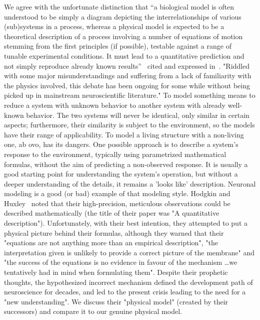 We agree with the unfortunate distinction that
“a biological model is
often understood to be simply a diagram depicting the interrelationships of various (sub)systems in a process,
whereas a physical model is expected to be a theoretical
description of a process involving a number of equations of
motion stemming from the first principles (if possible),
testable against a range of tunable experimental conditions.
It must lead to a quantitative prediction and not simply
reproduce already known results”~\cite{MolecularBiophysics:2003}
cited and expressed in~\cite{ThermodynamicAPDrukarch:2022}.
"Riddled with some major misunderstandings
and suffering from a lack of familiarity with the physics
involved, this debate has been ongoing for some while
without being picked up in mainstream neuroscientiﬁc
literature."
To model something means to reduce a system with unknown behavior
to another system with already well-known behavior. The two systems
will never be identical, only similar in certain aspects; furthermore,
their similarity is subject to the environment, so the models have
their range of applicability.
To model a living structure with a non-living one, ab ovo, has its dangers.
One possible approach is to describe a system's response
to the environment, typically using parametrized mathematical formulas,
without the aim of predicting a non-observed response. 
It is usually a good starting point for understanding the system's operation,
but without a deeper understanding of the details, it remains 
a 'looks like' description.
Neuronal modeling is a good (or bad) example of that modeling style.
Hodgkin and Huxley~\cite{HodgkinHuxley:1952} noted that their high-precision, meticulous observations could be described mathematically (the title of their paper was "A quantitative description").
Unfortunately, with their best intention, they
attempted to put a physical picture behind their formulas, although
they warned that their "equations are not anything more than an empirical description",
"the interpretation given is unlikely to provide a correct picture of the
membrane" and "the success of the equations is no evidence in
favour of the mechanism \dots we tentatively had in
mind when formulating them".
Despite their prophetic thoughts, the hypothesized incorrect mechanism defined the development path of neuroscience for decades, and led to
the present crisis leading to the need for a "new understanding".
We discuss their "physical model" (created by their successors) and compare it to our genuine physical model.



